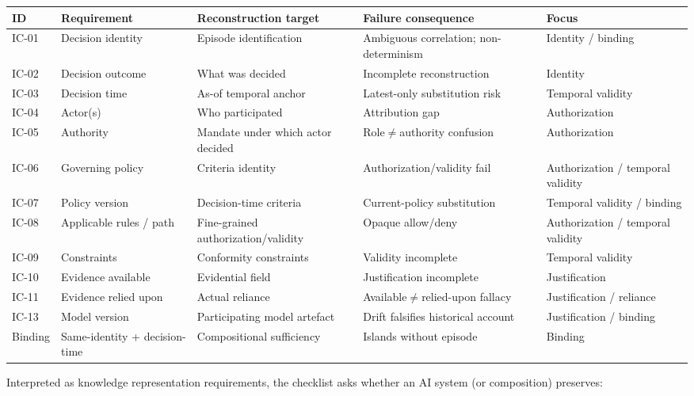 \documentclass[11pt,a4paper]{article}
\begin{document}
\begin{table}[t]
\centering
\small
\begin{tabularx}{\textwidth}{|X|X|X|X|X|}
\hline
 ID & Requirement & Reconstruction target & Failure consequence & Focus \\
 \hline
 \hline
 IC-01 & Decision identity & Episode identification & Ambiguous correlation; non-determinism & Identity / binding \\
 \hline
 IC-02 & Decision outcome & What was decided & Incomplete reconstruction & Identity \\
 \hline
 IC-03 & Decision time & As-of temporal anchor & Latest-only substitution risk & Temporal validity \\
 \hline
 IC-04 & Actor(s) & Who participated & Attribution gap & Authorization \\
 \hline
 IC-05 & Authority & Mandate under which actor decided & Role$\neq$authority confusion & Authorization \\
 \hline
 IC-06 & Governing policy & Criteria identity & Authorization/validity fail & Authorization / temporal validity \\
 \hline
 IC-07 & Policy version & Decision-time criteria & Current-policy substitution & Temporal validity / binding \\
 \hline
 IC-08 & Applicable rules / path & Fine-grained authorization/validity & Opaque allow/deny & Authorization / temporal validity \\
 \hline
 IC-09 & Constraints & Conformity constraints & Validity incomplete & Temporal validity \\
 \hline
 IC-10 & Evidence available & Evidential field & Justification incomplete & Justification \\
 \hline
 IC-11 & Evidence relied upon & Actual reliance & Available$\neq$relied-upon fallacy & Justification / reliance \\
 \hline
 IC-13 & Model version & Participating model artefact & Drift falsifies historical account & Justification / binding \\
 \hline
 Binding & Same-identity + decision-time & Compositional sufficiency & Islands without episode & Binding \\
 \hline
\end{tabularx}
\end{table}


Interpreted as knowledge representation requirements, the checklist asks whether an AI system (or composition) preserves:
\end{document}
